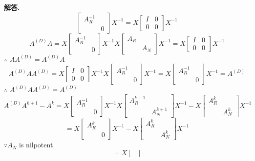 \documentclass[12pt, a4paper, oneside]{article}
\newenvironment{solution}{\par\noindent\textbf{解答. }}{\par}
\begin{document}
\begin{CJK}{UTF8}{gbsn}
\begin{solution}
$$\begin{bmatrix}
    A_R ^{-1} & \\ & 0 
  \end{bmatrix} X^{-1}  = X \begin{bmatrix}
    I & 0 \\ 0 & 0
  \end{bmatrix} X^{-1}$$ 
  $$ A^{(D)}A = X\begin{bmatrix}
    A_R ^{-1} & \\ & 0 
  \end{bmatrix}  X^{-1} X\begin{bmatrix}
    A_R & \\ & A_N 
  \end{bmatrix} X^{-1}  = X \begin{bmatrix}
    I & 0 \\ 0 & 0
  \end{bmatrix} X^{-1}
  $$
  $\therefore$ $AA^{(D)} = A^{(D)}A$
  $$ A^{(D)}AA^{(D)} =  X \begin{bmatrix}
    I & 0 \\ 0 & 0
  \end{bmatrix} X^{-1} X\begin{bmatrix}
    A_R ^{-1} & \\ & 0 
  \end{bmatrix}X^{-1} = X\begin{bmatrix}
    A_R ^{-1} & \\ & 0 
  \end{bmatrix}X^{-1} = A^{(D)} $$
  $\therefore$ $A^{(D)}AA^{(D)} = A^{(D)}$
  $$ A^{(D)}A^{k+1} - A^k = X\begin{bmatrix}
    A_R ^{-1} & \\ & 0 
  \end{bmatrix}X^{-1} X\begin{bmatrix}
    A_R^{k+1} & \\ & A_N^{k+1} 
  \end{bmatrix} X^{-1} - X\begin{bmatrix}
    A_R^{k} & \\ & A_N^{k} 
  \end{bmatrix}X^{-1}$$
  $$ =X\begin{bmatrix}
    A_R^{k} & \\ & 0
  \end{bmatrix}X^{-1} - X\begin{bmatrix}
    A_R^{k} & \\ & A_N^{k} 
  \end{bmatrix}X^{-1} $$
  $\because A_N$ is nilpotent
  $$ =X\begin{bmatrix}

\end{bmatrix}$$
\end{solution}
\end{CJK}
\end{document}
